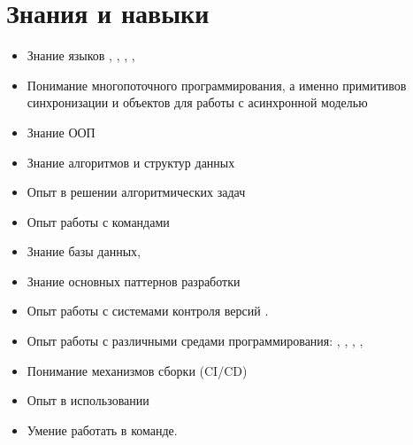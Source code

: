 \section*{Знания и навыки}

\begin{itemize}
    \item Знание языков , , , , 
    \item Понимание многопоточного программирования, а именно примитивов синхронизации и объектов для работы с асинхронной моделью
    \item Знание ООП
    \item Знание алгоритмов и структур данных
    \item Опыт в решении алгоритмических задач
    \item Опыт работы с командами 
    \item Знание базы данных, 
    \item Знание основных паттернов разработки
    \item Опыт работы с системами контроля версий .
    \item Опыт работы с различными средами программирования: , , , , 
    \item Понимание механизмов сборки (CI/CD)
    \item Опыт в использовании 
    \item Умение работать в команде.
\end{itemize}
